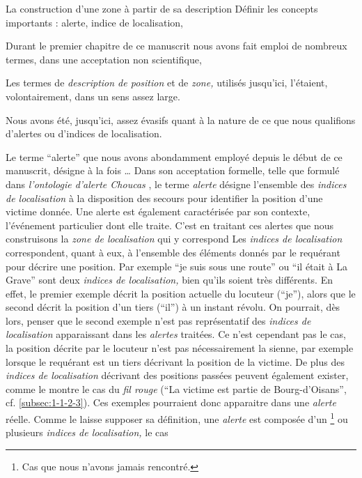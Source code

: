 
La construction d'une zone à partir de sa description 
%
Définir les concepts importants : alerte, indice de localisation,


Durant le premier chapitre de ce manuscrit nous avons fait emploi de
nombreux termes, dans une acceptation non scientifique, 

Les termes de \emph{description de position} et de \emph{zone,}
utilisés jusqu'ici, l'étaient, volontairement, dans un sens assez
large.


Nous avons été, jusqu'ici, assez évasifs quant à la nature de ce que
nous qualifions d'alertes ou d'indices de localisation.

Le terme \enquote{alerte} que nous avons abondamment employé depuis le
début de ce manuscrit, désigne à la fois …
%
Dans son acceptation formelle, telle que formulé dans
\emph{l’ontologie d'alerte Choucas} \autocite[\ac{oac},][]{Viry2019},
le terme \emph{alerte} désigne l'ensemble des \emph{indices de
  localisation} à la disposition des secours pour identifier la
position d'une victime donnée. Une alerte est également caractérisée
par son contexte, \ie l'événement particulier dont elle traite.
%
C'est en traitant ces alertes que nous construisons la \emph{zone de
localisation} qui y correspond
%
Les \emph{indices de localisation} correspondent, quant à eux, à
l'ensemble des éléments donnés par le requérant pour décrire une
position. Par exemple \enquote{je suis sous une route} ou \enquote{il
  était à La Grave} sont deux \emph{indices de localisation,} bien
qu'ils soient très différents. En effet, le premier exemple décrit la
position actuelle du locuteur (\enquote{je}), alors que le second
décrit la position d'un tiers (\enquote{il}) à un instant révolu. On
pourrait, dès lors, penser que le second exemple n'est pas
représentatif des \emph{indices de localisation} apparaissant dans les
\emph{alertes} traitées. Ce n'est cependant pas le cas, la position
décrite par le locuteur n'est pas nécessairement la sienne, par
exemple lorsque le requérant est un tiers décrivant la position de la
victime. De plus des \emph{indices de localisation} décrivant des
positions passées peuvent également exister, comme le montre le cas du
\emph{fil rouge} (\eg \enquote{La victime est partie de
  Bourg-d'Oisans}, cf. \autoref{subsec:1-1-2-3}). Ces exemples
pourraient donc apparaitre dans une \emph{alerte} réelle. Comme le
laisse supposer sa définition, une \emph{alerte} est composée d'un
\footnote{\label{note:cas_1_indice}Cas que nous n'avons jamais
  rencontré.} ou plusieurs \emph{indices de localisation,} le cas
